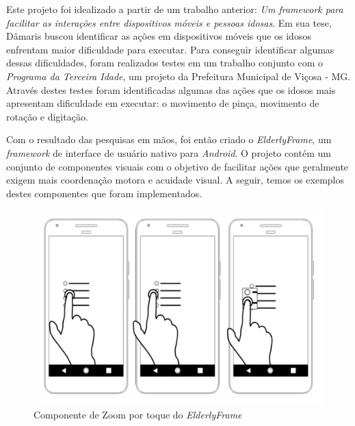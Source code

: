 \documentclass[
	12pt,				    %
	openright,			    %
	oneside,			    %
	a4paper,			    %
    sumario=tradicional,    %
	english,			    %
	brazil,				    %
	]{abntex2}              %
\begin{document}
\par

Este projeto foi idealizado a partir de um trabalho anterior: \textit{Um framework para facilitar as interações entre dispositivos móveis e pessoas idosas}\cite{tesedamaris}. Em sua tese, Dâmaris buscou identificar as ações em dispositivos móveis que os idosos enfrentam maior dificuldade para executar. Para conseguir identificar algumas dessas dificuldades, foram realizados testes em um trabalho conjunto com o \emph{Programa da Terceira Idade}, um projeto da Prefeitura Municipal de Viçosa - MG. Através destes testes foram identificadas algumas das ações que os idosos mais apresentam dificuldade em executar: o movimento de pinça, movimento de rotação e digitação.

\par

Com o resultado das pesquisas em mãos, foi então criado o \textit{ElderlyFrame}\cite{elderlyframe}, um \textit{framework} de interface de usuário nativo para \textit{Android}. O projeto contém um conjunto de componentes visuais com o objetivo de facilitar ações que geralmente exigem mais coordenação motora e acuidade visual. A seguir, temos os exemplos destes componentes que foram implementados.

\begin{figure}[H]
	\begin{center}
		\includegraphics[height=0.4\linewidth]{images/touchable-zoom.png}
	\end{center}
	\caption[Componente \textit{TouchZoom} do \textit{ElderlyFrame}]{Componente de Zoom por toque do \textit{ElderlyFrame}}
	\label{fig:touchableZoom}
\end{figure}
\end{document}
